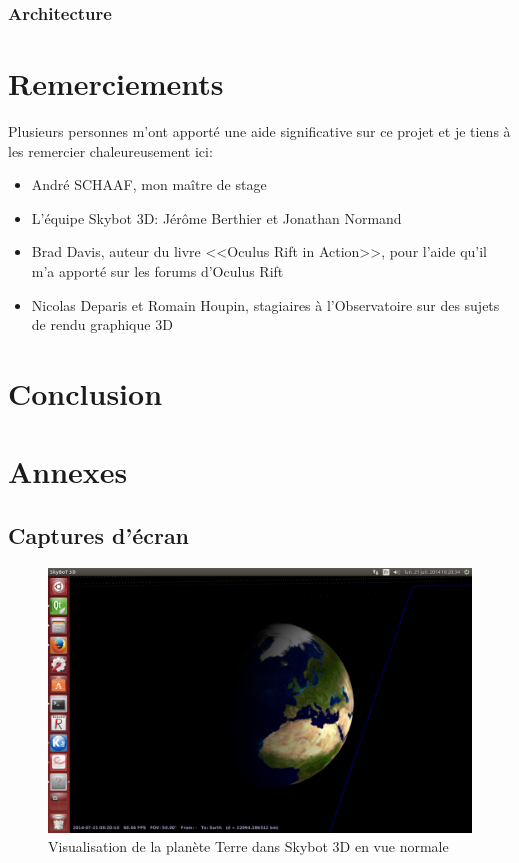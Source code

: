 \documentclass[a4paper,french,12pt]{article}
\begin{document}
	    
	
	\subsubsection{Architecture}
	

			
\section{Remerciements}

	Plusieurs personnes m’ont apporté une aide significative sur ce projet et je tiens à les remercier chaleureusement ici: 

	\begin{itemize}
	 \item André SCHAAF, mon maître de stage
	 \item L'équipe Skybot 3D: Jérôme Berthier et Jonathan Normand
	 \item Brad Davis, auteur du livre <<Oculus Rift in Action>>, pour l'aide qu'il m'a apporté sur les forums d'Oculus Rift
	 \item Nicolas Deparis et Romain Houpin, stagiaires à l'Observatoire sur des sujets de rendu graphique 3D
	\end{itemize}

\section{Conclusion}



\section{Annexes}
	
	\subsection{Captures d'écran}
		\FloatBarrier
		\begin{figure}
			      \centering
			      \includegraphics[width=1.0\textwidth]{skybot_normal_earth.png}
			      \caption{Visualisation de la planète Terre dans Skybot 3D en vue normale}
		\end{figure}
		
\end{document}
